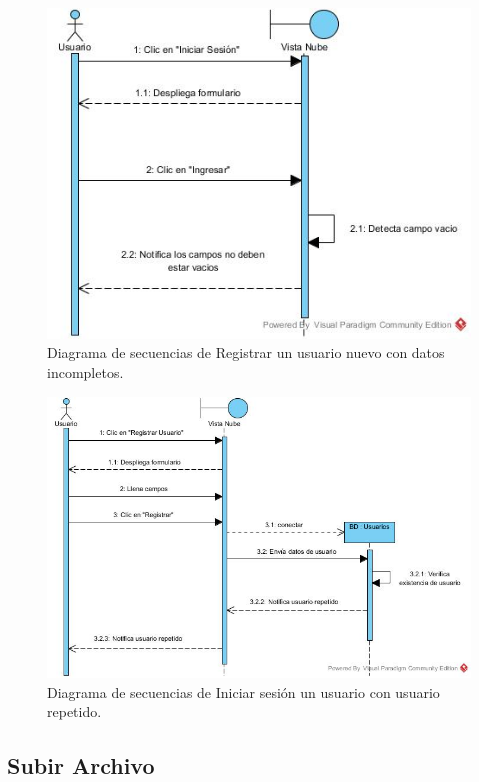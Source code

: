 \begin{figure}[htbp!]
\centering
\includegraphics[width=1\textwidth]{images/Iniciar_trayectoria_b}
\caption{Diagrama de secuencias de Registrar un usuario nuevo con datos incompletos.}
\end{figure}

\begin{figure}[htbp!]
\centering
\includegraphics[width=1\textwidth]{images/Registrar_trayectoria_c}
\caption{Diagrama de secuencias de Iniciar sesión un usuario con usuario repetido.}
\end{figure} 
\newpage

\subsection{Subir Archivo}

